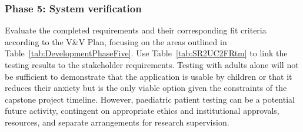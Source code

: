 \documentclass[10pt]{article}
\begin{document}
\subsubsection*{Phase 5: System verification}

Evaluate the completed requirements and their
corresponding fit criteria according to the V\&V Plan,
focusing on the areas outlined in
Table~\ref{tab:DevelopmentPhaseFive}.
Use Table~\ref{tab:SR2UC2FRtm} to link the testing
results to the stakeholder requirements.
Testing with adults alone will not be sufficient to 
demonstrate that the application is usable by children
or that it reduces their anxiety but is the only viable 
option given the constraints of the capstone project 
timeline. However, paediatric patient testing can be a 
potential future activity, contingent on appropriate 
ethics and institutional approvals, resources, 
and separate arrangements for research supervision.
\end{document}
